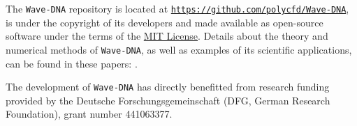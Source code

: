 The {\tt Wave-DNA} repository is located at \href{https://github.com/polycfd/Wave-DNA}{\texttt{https://github.com/polycfd/Wave-DNA}}, is under the copyright of its developers and made available as open-source software under the terms of the \href{https://opensource.org/license/mit/}{MIT License}. Details about the theory and numerical methods of {\tt Wave-DNA}, as well as examples of its scientific applications, can be found in these papers: \citep{Schenke_et_al_2022, Schenke_et_al_2022_PoF, Schenke_et_al_2023_JASA,Denner2024}.

The development of {\tt Wave-DNA} has directly benefitted from research funding provided by the Deutsche Forschungsgemeinschaft (DFG, German Research Foundation), grant number 441063377.


